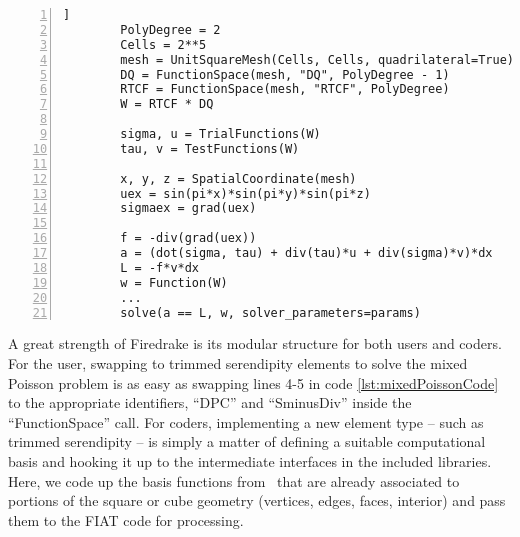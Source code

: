 \documentclass[manuscript,screen]{acmart}
\begin{document}
  \lstset{language=Python}
  \lstset{basicstyle=\footnotesize\ttfamily,breaklines=true}
  \begin{lstlisting}[frame=single, caption={Basic Firedrake implementation of the mixed Poisson problem.}, label={lst:mixedPoissonCode}, numbers=left]]
        PolyDegree = 2
        Cells = 2**5
        mesh = UnitSquareMesh(Cells, Cells, quadrilateral=True)
        DQ = FunctionSpace(mesh, "DQ", PolyDegree - 1)
        RTCF = FunctionSpace(mesh, "RTCF", PolyDegree)
        W = RTCF * DQ

        sigma, u = TrialFunctions(W)
        tau, v = TestFunctions(W)

        x, y, z = SpatialCoordinate(mesh)
        uex = sin(pi*x)*sin(pi*y)*sin(pi*z)
        sigmaex = grad(uex)
        
        f = -div(grad(uex))
        a = (dot(sigma, tau) + div(tau)*u + div(sigma)*v)*dx
        L = -f*v*dx
        w = Function(W)
        ...
        solve(a == L, w, solver_parameters=params)
  \end{lstlisting}
  
  
	A great strength of Firedrake is its modular structure for both users and coders.
   For the user, swapping to trimmed serendipity elements to solve the mixed Poisson problem is as easy as swapping lines 4-5 in code \ref{lst:mixedPoissonCode} to the appropriate identifiers, ``DPC'' and ``SminusDiv'' inside the ``FunctionSpace'' call.  
   For coders, implementing a new element type -- such as trimmed serendipity -- is simply a matter of defining a suitable computational basis and hooking it up to the intermediate interfaces in the included libraries.  Here, we code up the basis functions from~\cite{gillette2019computational} that are already associated to portions of the square or cube geometry (vertices, edges, faces, interior) and pass them to the FIAT code for processing.
   
\end{document}
